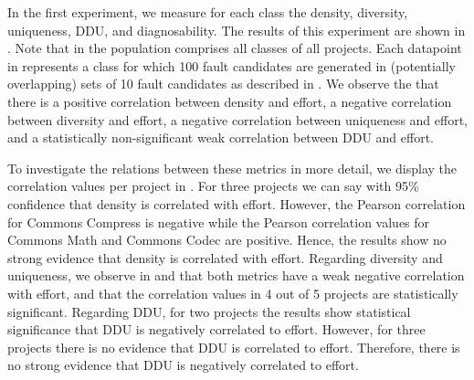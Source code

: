\documentclass[twoside,a4paper,11pt]{memoir}
\begin{document}
In the first experiment, we measure for each class the density, diversity, uniqueness, DDU, and diagnosability.
The results of this experiment are shown in .
Note that in  the population comprises all classes of all projects.
Each datapoint in  represents a class for which 100 fault candidates are generated in (potentially overlapping) sets of 10 fault candidates as described in .
We observe the that there is a positive correlation between density and effort, a negative correlation between diversity and effort, a negative correlation between uniqueness and effort, and a statistically non-significant weak correlation between DDU and effort.

To investigate the relations between these metrics in more detail, we display the correlation values per project in .
For three projects we can say with 95\% confidence that density is correlated with effort.
However, the Pearson correlation for Commons Compress is negative while the Pearson correlation values for Commons Math and Commons Codec are positive.
Hence, the results show no strong evidence that density is correlated with effort.
Regarding diversity and uniqueness, we observe in  and  that both metrics have a weak negative correlation with effort, and that the correlation values in 4 out of 5 projects are statistically significant.
Regarding DDU, for two projects the results show statistical significance that DDU is negatively correlated to effort.
However, for three projects there is no evidence that DDU is correlated to effort.
Therefore, there is no strong evidence that DDU is negatively correlated to effort.
\end{document}
